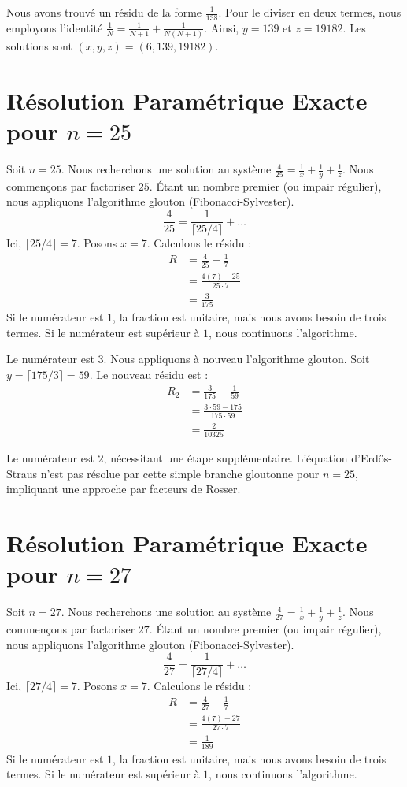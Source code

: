 \documentclass[11pt,a4paper]{article}
\begin{document}
Nous avons trouvé un résidu de la forme $\frac{1}{138}$. Pour le diviser en deux termes, nous employons l'identité $\frac{1}{N} = \frac{1}{N+1} + \frac{1}{N(N+1)}$.
Ainsi, $y = 139$ et $z = 19182$.
Les solutions sont $(x, y, z) = (6, 139, 19182)$.

\section{Résolution Paramétrique Exacte pour $n = 25$}
Soit $n = 25$. Nous recherchons une solution au système $\frac{4}{25} = \frac{1}{x} + \frac{1}{y} + \frac{1}{z}$.
Nous commençons par factoriser $25$. Étant un nombre premier (ou impair régulier), nous appliquons l'algorithme glouton (Fibonacci-Sylvester).
\begin{equation}
\frac{4}{25} = \frac{1}{\lceil 25/4 \rceil} + \ldots
\end{equation}
Ici, $\lceil 25/4 \rceil = 7$. Posons $x = 7$.
Calculons le résidu :
\begin{align*}
R &= \frac{4}{25} - \frac{1}{7} \\
&= \frac{4(7) - 25}{25 \cdot 7} \\
&= \frac{3}{175}
\end{align*}
Si le numérateur est $1$, la fraction est unitaire, mais nous avons besoin de trois termes. Si le numérateur est supérieur à $1$, nous continuons l'algorithme.

Le numérateur est $3$. Nous appliquons à nouveau l'algorithme glouton.
Soit $y = \lceil 175/3 \rceil = 59$.
Le nouveau résidu est :
\begin{align*}
R_2 &= \frac{3}{175} - \frac{1}{59} \\
&= \frac{3 \cdot 59 - 175}{175 \cdot 59} \\
&= \frac{2}{10325}
\end{align*}

Le numérateur est $2$, nécessitant une étape supplémentaire. L'équation d'Erd\H{o}s-Straus n'est pas résolue par cette simple branche gloutonne pour $n=25$, impliquant une approche par facteurs de Rosser.

\section{Résolution Paramétrique Exacte pour $n = 27$}
Soit $n = 27$. Nous recherchons une solution au système $\frac{4}{27} = \frac{1}{x} + \frac{1}{y} + \frac{1}{z}$.
Nous commençons par factoriser $27$. Étant un nombre premier (ou impair régulier), nous appliquons l'algorithme glouton (Fibonacci-Sylvester).
\begin{equation}
\frac{4}{27} = \frac{1}{\lceil 27/4 \rceil} + \ldots
\end{equation}
Ici, $\lceil 27/4 \rceil = 7$. Posons $x = 7$.
Calculons le résidu :
\begin{align*}
R &= \frac{4}{27} - \frac{1}{7} \\
&= \frac{4(7) - 27}{27 \cdot 7} \\
&= \frac{1}{189}
\end{align*}
Si le numérateur est $1$, la fraction est unitaire, mais nous avons besoin de trois termes. Si le numérateur est supérieur à $1$, nous continuons l'algorithme.
\end{document}
